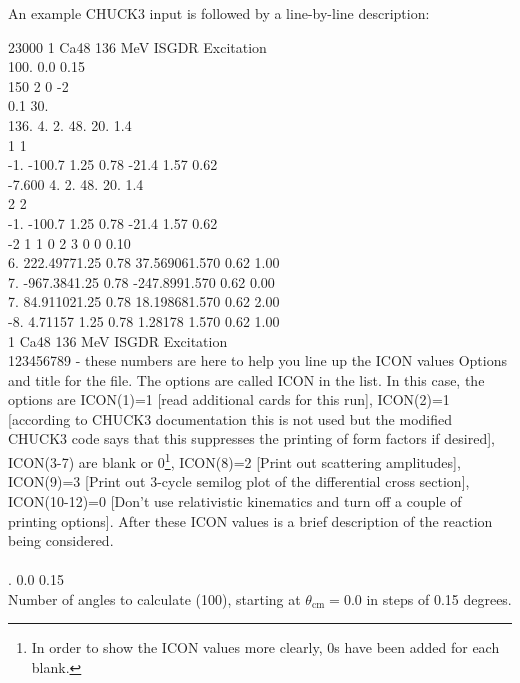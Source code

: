 \documentclass[a4paper,10pt]{article}
\begin{document}
An example CHUCK3 input is followed by a line-by-line description:

     23000     1    Ca48  136 MeV      ISGDR Excitation\\
100.    0.0    0.15\\
150  2  0 -2\\
0.1     30.\\
136.    4.      2.      48.     20.     1.4\\
  1  1\\
-1.     -100.7  1.25    0.78            -21.4   1.57    0.62 \\
-7.600  4.      2.      48.     20.     1.4\\
  2  2\\
-1.     -100.7  1.25    0.78            -21.4   1.57    0.62 \\
 -2  1  1  0  2  3  0  0 0.10\\
6.      222.49771.25    0.78            37.569061.570   0.62            1.00\\
7.      -967.3841.25    0.78            -247.8991.570   0.62            0.00\\
7.      84.911021.25    0.78            18.198681.570   0.62            2.00\\
-8.     4.71157 1.25    0.78            1.28178 1.570   0.62            1.00\\
            
     1    Ca48  136 MeV      ISGDR Excitation\\
123456789 - these numbers are here to help you line up the ICON values
Options and title for the file. The options are called ICON in the list. In this case, the options are ICON(1)=1 [read additional cards for this run], ICON(2)=1 [according to CHUCK3 documentation this is not used but the modified CHUCK3 code says that this suppresses the printing of form factors if desired], ICON(3-7) are blank or 0\footnote{In order to show the ICON values more clearly, 0s have been added for each blank.}, ICON(8)=2 [Print out scattering amplitudes], ICON(9)=3 [Print out 3-cycle semilog plot of the differential cross section], ICON(10-12)=0 [Don't use relativistic kinematics and turn off a couple of printing options]. After these ICON values is a brief description of the reaction being considered.\\ \\

.    0.0    0.15\\
Number of angles to calculate (100), starting at $\theta_\mathrm{cm} = 0.0$ in steps of 0.15 degrees.\\
\end{document}
